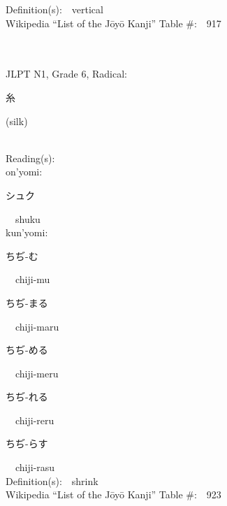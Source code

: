 \begin{multicols}{2}
Definition(s):\ \ vertical \\
Wikipedia ``List of the J\=oy\=o Kanji'' Table \#:\ \ 917 \\
\ \ \\
{\fontsize{34pt}{40pt}  }\ \ \\  %
{JLPT N1, Grade 6, Radical:\ \ {\begin{CJK}{UTF8}{min} 糸 \end{CJK}} (silk) } \\
Reading(s):\ \ \\
{\hspace*{1em}}on'yomi:\ \ \\
{\hspace*{2em}}{\begin{CJK}{UTF8}{min} シュク \end{CJK}}\ \ shuku\ \ \\
{\hspace*{1em}}kun'yomi:\ \ \\
{\hspace*{2em}}{\begin{CJK}{UTF8}{min} ちぢ-む \end{CJK}}\ \ chiji-mu\ \ \\
{\hspace*{2em}}{\begin{CJK}{UTF8}{min} ちぢ-まる \end{CJK}}\ \ chiji-maru\ \ \\
{\hspace*{2em}}{\begin{CJK}{UTF8}{min} ちぢ-める \end{CJK}}\ \ chiji-meru\ \ \\
{\hspace*{2em}}{\begin{CJK}{UTF8}{min} ちぢ-れる \end{CJK}}\ \ chiji-reru\ \ \\
{\hspace*{2em}}{\begin{CJK}{UTF8}{min} ちぢ-らす \end{CJK}}\ \ chiji-rasu\ \ \\
Definition(s):\ \ shrink \\
Wikipedia ``List of the J\=oy\=o Kanji'' Table \#:\ \ 923 \\
\ \ \\

\end{multicols}
